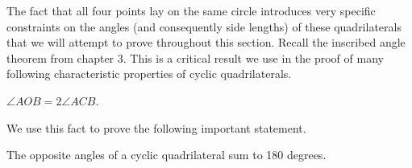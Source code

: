 The fact that all four points lay on the same circle introduces very specific constraints on the angles (and consequently side lengths) of these quadrilaterals that we will attempt to prove throughout this section. Recall the inscribed angle theorem from chapter 3. This is a critical result we use in the proof of many following characteristic properties of cyclic quadrilaterals.

\begin{theorem}
$\angle AOB = 2 \angle ACB$.
\begin{center}
\end{center}
\end{theorem}


We use this fact to prove the following important statement.

\begin{corollary}
The opposite angles of a cyclic quadrilateral sum to 180 degrees.
\end{corollary}

